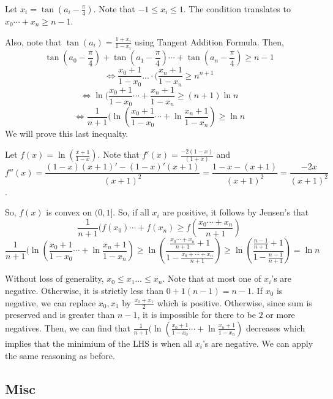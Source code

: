 \documentclass[11pt]{article}
\begin{document}

\begin{sol}
Let $x_{i}=\tan(a_{i}-\frac{\pi}{4})$. Note that $-1\leq x_{i}\leq 1$. The condition translates to $x_{0}\cdots + x_{n} \ge n-1$. 

Also, note that $\tan(a_{i}) = \frac{1+x_{i}}{1-x_{i}}$ using Tangent Addition Formula. Then, 
$$\tan(a_{0}-\frac{\pi}{4})+\tan(a_{1}-\frac{\pi}{4}) \cdots + \tan(a_{n}-\frac{\pi}{4}) \ge n-1$$
$$\iff \frac{x_{0}+1}{1-x_{0}}... \cdot (\frac{x_{n}+1}{1-x_{n}} \ge n^{n+1}$$
$$\iff \ln (\frac{x_{0}+1}{1-x_{0}}\cdots + \frac{x_{n}+1}{1-x_{n}} \ge (n+1) \ln n$$
$$\iff \frac{1}{n+1}(\ln (\frac{x_{0}+1}{1-x_{0}}\cdots + \ln \frac{x_{n}+1}{1-x_{n}}) \ge \ln n$$
We will prove this last inequalty.

Let $f(x) = \ln(\frac{x+1}{1-x})$. Note that $f'(x) = \frac{-2(1-x)}{(1+x)}$ and 
$$f''(x)=\frac{(1-x)(x+1)'-(1-x)'(x+1)}{(x+1)^2} = \frac{1-x -(x+1)}{(x+1)^2} = \frac{-2x}{(x+1)^2}$$. 

So, $f(x)$ is convex on $(0,1]$. So, if all $x_{i}$ are positive, it follows by Jensen's that 
$$\frac{1}{n+1} (f(x_{0}) \cdots + f(x_{n}) \ge f(\frac{x_{0}\cdots +x_{n}}{n+1})$$
$$\frac{1}{n+1}(\ln (\frac{x_{0}+1}{1-x_{0}}\cdots + \ln \frac{x_{n}+1}{1-x_{n}}) \ge \ln(\frac{\frac{x_{0}\cdots +x_{n}}{n+1}+1}{1-\frac{x_{0}+\cdots + x_{n}}{n+1}}) \ge \ln(\frac{\frac{n-1}{n+1}+1}{1-\frac{n-1}{n+1}})= \ln n$$

Without loss of generality, $x_{0}\leq x_{1} \ldots \leq x_{n}$. Note that at most one of $x_{i}$'s are negative. Otherwise, it is strictly less than $0+1(n-1)=n-1$. If $x_{0}$ is negative, we can replace $x_{0},x_{1}$ by $\frac{x_{0}+x_{1}}{2}$ which is positive. Otherwise, since sum is preserved and is greater than $n-1$, it is impossible for there to be $2$ or more negatives. Then, we can find that $\frac{1}{n+1}(\ln (\frac{x_{0}+1}{1-x_{0}}\cdots + \ln \frac{x_{n}+1}{1-x_{n}})$ decreases which implies that the minimium of the LHS is when all $x_{i}$'s are negative. We can apply the same reasoning as before.
\end{sol}

\subsection{Misc}
\end{document}
